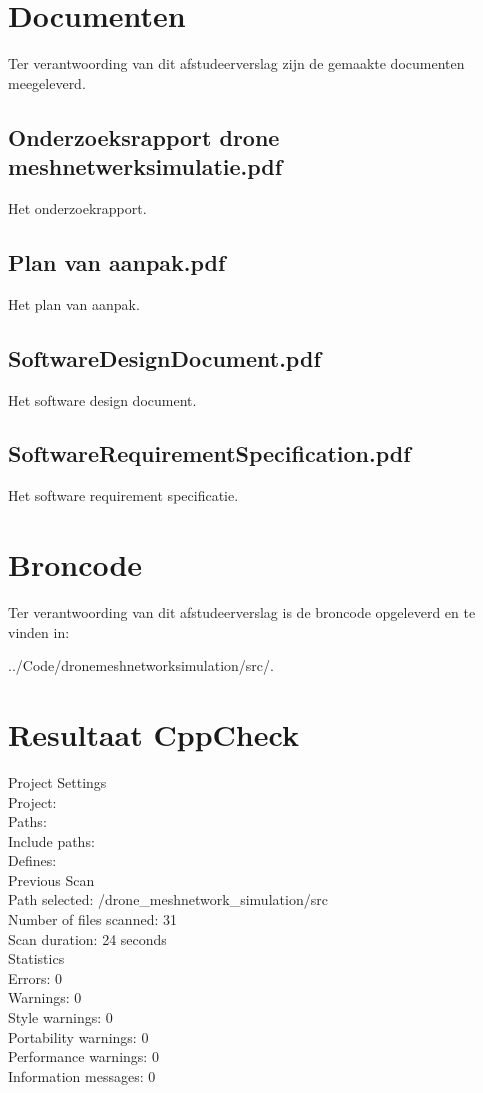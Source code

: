 \documentclass[a4paper, 11pt, oneside]{report}
\begin{document}



\clearpage
\appendix
\chapter{Documenten}
Ter verantwoording van dit afstudeerverslag zijn de gemaakte documenten meegeleverd.
\section[Onderzoeksrapport Drone meshnetwerk simulatie]{Onderzoeksrapport drone meshnetwerksimulatie.pdf}\label{sec:onderzoeksrapport-drone-meshnetwerk-simulatie}
Het onderzoekrapport.
\section[Plan van aanpak]{Plan van aanpak.pdf}\label{app:bijlage:plan-van-aanpak}
Het plan van aanpak.
\section[SoftwareDesignDocument]{SoftwareDesignDocument.pdf}\label{app:SoftwareDesignDocument}
Het software design document.
\section[SoftwareRequirementSpecification]{SoftwareRequirementSpecification.pdf}\label{app:softwarerequirementspecification}
Het software requirement specificatie.
\chapter{Broncode}\label{app:broncode}
Ter verantwoording van dit afstudeerverslag is de broncode opgeleverd en te vinden in:

../Code/drone\textunderscore meshnetwork\textunderscore simulation/src/.

\chapter{Resultaat CppCheck}\label{sec:resultaat-cppcheck}
Project Settings\\
Project:	\\
Paths:	\\
Include paths:	\\
Defines:	\\
Previous Scan \\
Path selected:	/drone\_meshnetwork\_simulation/src \\
Number of files scanned:	31 \\
Scan duration:	24 seconds \\
Statistics \\
Errors:	0\\
Warnings:	0\\
Style warnings:	0\\
Portability warnings:	0\\
Performance warnings:	0\\
Information messages:	0\\
\end{document}
